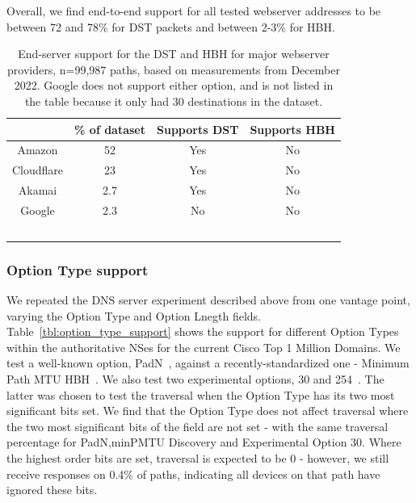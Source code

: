 \documentclass[conference]{IEEEtran}
\begin{document}
Overall, we find end-to-end support for all tested webserver addresses to be between 72 and 78\% for DST packets and between 2-3\% for HBH.


\begin{table} 
\begin{tabular}{c|c|c|c}
           & \% of dataset & Supports DST & Supports HBH \\
\hline
Amazon & 52                      & Yes                & No                 \\
\hline
Cloudflare     & 23                     & Yes                 & No                 \\
\hline
Akamai    & 2.7                     & Yes                & No                 \\
\hline
Google      & 2.3                     & No                 & No                 \\
\
\end{tabular}
\label{tbl:web_provider_support}
\caption{End-server support for the DST and HBH for major webserver providers, n=99,987 paths, based on measurements from December 2022. Google does not support either option, and is not listed in the table because it only had 30 destinations in the dataset.
}
\end{table}


\subsubsection{Option Type support}

We repeated the DNS server experiment described above from one vantage point, varying the Option Type and Option Lnegth fields. 
Table~\ref{tbl:option_type_support} shows the support for different Option Types within the authoritative NSes for the current Cisco Top 1 Million Domains. We test a well-known option, PadN~\cite{rfc2460}, against a recently-standardized one - Minimum Path MTU HBH~\cite{rfc9268}. We also test two experimental options, 30 and 254~\cite{RFC4727}. The latter was chosen to test the traversal when the Option Type has its two most significant bits set.
We find that the Option Type does not affect traversal where the two most significant bits of the field are not set - with the same traversal percentage for PadN,minPMTU Discovery and Experimental Option 30. Where the highest order bits are set, traversal is expected to be 0 - however, we still receive responses on 0.4\% of paths, indicating all devices on that path have ignored these bits.
\end{document}
